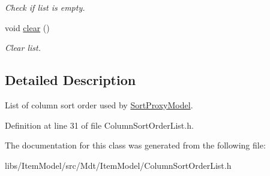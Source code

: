 \begin{DoxyCompactItemize}
\begin{DoxyCompactList}\small\item\em Check if list is empty. \end{DoxyCompactList}\item 
void \hyperlink{class_mdt_1_1_item_model_1_1_column_sort_order_list_a7ad3c2689a4928677131517cb1502cbe}{clear} ()\hypertarget{class_mdt_1_1_item_model_1_1_column_sort_order_list_a7ad3c2689a4928677131517cb1502cbe}{}\label{class_mdt_1_1_item_model_1_1_column_sort_order_list_a7ad3c2689a4928677131517cb1502cbe}

\begin{DoxyCompactList}\small\item\em Clear list. \end{DoxyCompactList}\end{DoxyCompactItemize}


\subsection{Detailed Description}
List of column sort order used by \hyperlink{class_mdt_1_1_item_model_1_1_sort_proxy_model}{Sort\+Proxy\+Model}. 

Definition at line 31 of file Column\+Sort\+Order\+List.\+h.



The documentation for this class was generated from the following file\+:\begin{DoxyCompactItemize}
\item 
libs/\+Item\+Model/src/\+Mdt/\+Item\+Model/Column\+Sort\+Order\+List.\+h\end{DoxyCompactItemize}
